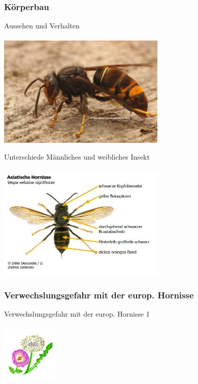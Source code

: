 \documentclass[aspectratio=169]{beamer}
\begin{document}
\subsubsection[Körperbau]{Körperbau}

\begin{frame}{Aussehen und Verhalten}
	\framesubtitle{} 
	\begin{center}	
		\includegraphics[width=0.6\textwidth]{figures/asiatische_hornisse3.jpg}
	\end{center}
\end{frame}

\begin{frame}{Unterschiede Männliches und weibliches Insekt}
	\framesubtitle{} 

	\begin{center}	
		\includegraphics[width=0.6\textwidth]{figures/Asiatische_Hornisse.JPG}
	\end{center}

	\end{frame}

\subsubsection[Verwechslungsgefahr]{Verwechslungsgefahr mit der europ. Hornisse}

\begin{frame}{Verwechslungsgefahr mit der europ. Hornisse 1}
	\framesubtitle{} 
	\begin{center}	
		\includegraphics[width=0.2\textwidth]{figures/BH-Logo_Quat.png}
	\end{center}
	\end{frame}
\end{document}

